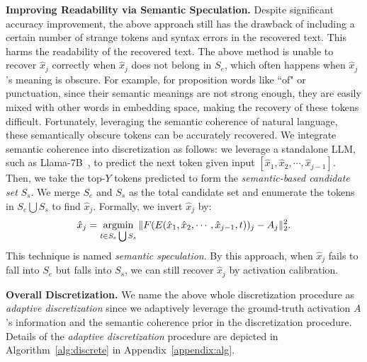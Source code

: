\noindent \textbf{Improving Readability via Semantic Speculation.} 
Despite significant accuracy improvement, the above approach still has the drawback of including a certain number of strange tokens and syntax errors in the recovered text. This harms the readability of the recovered text.
The above method is unable to recover $\hat{x}_j$ correctly when $\hat{x}_j$ does not belong in $S_e$, which often happens when $\hat{x}_j$'s meaning is obscure. For example, for proposition words like ``of"  or punctuation, since their semantic meanings are not strong enough, they are easily mixed with other words in embedding space, making the recovery of these tokens difficult. 
Fortunately, leveraging the semantic coherence of natural language, these semantically obscure tokens can be accurately recovered.  We integrate semantic coherence  into discretization as follows: we leverage a standalone LLM, such as Llama-7B~\cite{llama}, to predict the next token given input $[\hat{x}_1,\hat{x}_2,\cdots,\hat{x}_{j-1}]$. Then, we take the top-$Y$ tokens predicted to form the \emph{semantic-based candidate set} $S_s$. We merge $S_e$ and $S_s$ as the total candidate set and enumerate the tokens in  $S_e\bigcup S_s$ to find $\hat{x}_j$. Formally, we invert  $\hat{x}_j$ by:
\begin{align}
    \hat{x}_j=\operatorname*{argmin}_{t\in S_e\bigcup S_s}\| F(E(\hat{x}_1,\hat{x}_2,\cdots,\hat{x}_{j-1},t))_j-A_j \|_2^2 .
\end{align}
This technique is named \textit{semantic speculation}. By this approach, when $\hat{x}_j$ fails to fall into $S_e$ but falls into $S_s$, we can still recover $\hat{x}_j$ by activation calibration.



\noindent \textbf{Overall Discretization.} We name the above whole discretization procedure as \textit{adaptive discretization} since we adaptively leverage the ground-truth activation $A$'s information and the semantic coherence prior in the discretization procedure. Details of the \textit{adaptive discretization} procedure are depicted in Algorithm~\ref{alg:discrete} in Appendix~\ref{appendix:alg}. 








